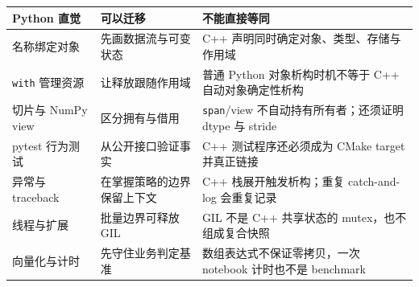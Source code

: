 \noindent
\begin{tabularx}{\textwidth}{@{}p{}p{}X@{}}
\toprule
Python 直觉 & 可以迁移 & 不能直接等同 \\
\midrule
名称绑定对象 & 先画数据流与可变状态 & C++ 声明同时确定对象、类型、存储与作用域 \\
\texttt{with} 管理资源 & 让释放跟随作用域 & 普通 Python 对象析构时机不等于 C++ 自动对象确定性析构 \\
切片与 NumPy view & 区分拥有与借用 & \texttt{span}/view 不自动持有所有者；还须证明 dtype 与 stride \\
pytest 行为测试 & 从公开接口验证事实 & C++ 测试程序还必须成为 CMake target 并真正链接 \\
异常与 traceback & 在掌握策略的边界保留上下文 & C++ 栈展开触发析构；重复 catch-and-log 会重复记录 \\
线程与扩展 & 批量边界可释放 GIL & GIL 不是 C++ 共享状态的 mutex，也不组成复合快照 \\
向量化与计时 & 先守住业务判定基准 & 数组表达式不保证零拷贝，一次 notebook 计时也不是 benchmark \\
\bottomrule
\end{tabularx}
